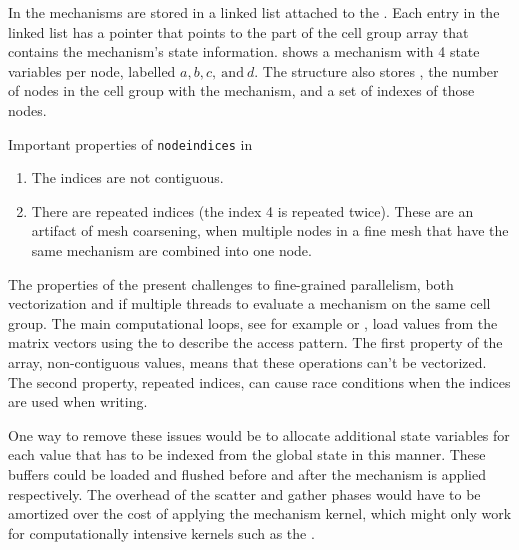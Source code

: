In \neuron the mechanisms are stored in a linked list attached to the .
Each entry in the linked list has a  pointer that points to the part of the cell group array that contains the mechanism's state information.
 shows a mechanism with 4 state variables per node, labelled $a,b,c,~\text{and}~d$.
The  structure also stores , the number of nodes in the cell group with the mechanism, and a set of indexes  of those nodes.

\begin{infobox}{Important properties of \texttt{nodeindices} in }
\begin{enumerate}[leftmargin=*]
\item
The indices are not contiguous.
\item
There are repeated indices (the index 4 is repeated twice). These are an artifact of mesh coarsening, when multiple nodes in a fine mesh that have the same mechanism are combined into one node.
\end{enumerate}
\end{infobox}

The properties of the  present challenges to fine-grained parallelism, both vectorization and if multiple threads to evaluate a mechanism on the same cell group.
The main computational loops, see for example  or , load values from the matrix vectors using the  to describe the access pattern.
The first property of the array, non-contiguous values, means that these operations can't be vectorized.
The second property, repeated indices, can cause race conditions when the indices are used when writing.

One way to remove these issues would be to allocate additional state variables for each value that has to be indexed from the global state in this manner.
These buffers could be loaded and flushed before and after the mechanism is applied respectively.
The overhead of the scatter and gather phases would have to be amortized over the cost of applying the mechanism kernel, which might only work for computationally intensive kernels such as the .
